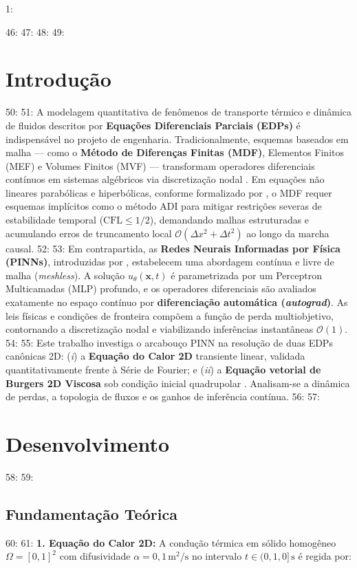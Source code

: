 1: \documentclass[a4paper, 12pt, twoside]{article}
\begin{document}
46: 
47: %
48: 
49: \section{Introdução}
50: 
51: A modelagem quantitativa de fenômenos de transporte térmico e dinâmica de fluidos descritos por \textbf{Equações Diferenciais Parciais (EDPs)} é indispensável no projeto de engenharia. Tradicionalmente, esquemas baseados em malha --- como o \textbf{Método de Diferenças Finitas (MDF)}, Elementos Finitos (MEF) e Volumes Finitos (MVF) --- transformam operadores diferenciais contínuos em sistemas algébricos via discretização nodal \parencite{pereira2019}. Em equações não lineares parabólicas e hiperbólicas, conforme formalizado por \textcite{pereira2019}, o MDF requer esquemas implícitos como o método ADI \parencite{peaceman1955adi} para mitigar restrições severas de estabilidade temporal ($\text{CFL} \le 1/2$), demandando malhas estruturadas e acumulando erros de truncamento local $\mathcal{O}(\Delta x^2 + \Delta t^2)$ ao longo da marcha causal.
52: 
53: Em contrapartida, as \textbf{Redes Neurais Informadas por Física (PINNs)}, introduzidas por \textcite{raissi2019pinns}, estabelecem uma abordagem contínua e livre de malha (\textit{meshless}). A solução $u_\theta(\mathbf{x}, t)$ é parametrizada por um Perceptron Multicamadas (MLP) profundo, e os operadores diferenciais são avaliados exatamente no espaço contínuo por \textbf{diferenciação automática (\textit{autograd})}. As leis físicas e condições de fronteira compõem a função de perda multiobjetivo, contornando a discretização nodal e viabilizando inferências instantâneas $\mathcal{O}(1)$.
54: 
55: Este trabalho investiga o arcabouço PINN na resolução de duas EDPs canônicas 2D: (\textit{i}) a \textbf{Equação do Calor 2D} transiente linear, validada quantitativamente frente à Série de Fourier; e (\textit{ii}) a \textbf{Equação vetorial de Burgers 2D Viscosa} sob condição inicial quadrupolar \parencite{burgers1948model, pereira2019}. Analisam-se a dinâmica de perdas, a topologia de fluxos e os ganhos de inferência contínua.
56: 
57: \section{Desenvolvimento}
58: 
59: \subsection{Fundamentação Teórica}
60: 
61: \textbf{1. Equação do Calor 2D:} A condução térmica em sólido homogêneo $\Omega = [0, 1]^2$ com difusividade $\alpha = 0{,}1\,\text{m}^2/\text{s}$ no intervalo $t \in (0, 1{,}0]\,\text{s}$ é regida por:
\end{document}
